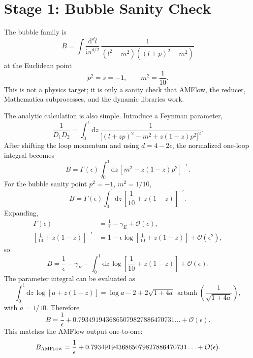 \documentclass[11pt]{article}
\newcommand{\dd}{\mathrm{d}}
\newcommand{\ii}{\mathrm{i}}
\newcommand{\eps}{\epsilon}
\newcommand{\AMFlow}{\textsc{AMFlow}}
\begin{document}
\section{Stage 1: Bubble Sanity Check}

The bubble family is
\begin{equation}
  B =
  \int \frac{\dd^d l}{\ii\pi^{d/2}}\,
  \frac{1}{(l^2-m^2)((l+p)^2-m^2)}
\end{equation}
at the Euclidean point
\begin{equation}
  p^2=s=-1,\qquad m^2=\frac{1}{10}.
\end{equation}
This is not a physics target; it is only a sanity check that AMFlow, the
reducer, Mathematica subprocesses, and the dynamic libraries work.

The analytic calculation is also simple. Introduce a Feynman parameter,
\begin{equation}
  \frac{1}{D_1D_2}
  =
  \int_0^1 \dd z\,
  \frac{1}{\bigl[(l+zp)^2-m^2+z(1-z)p^2\bigr]^2}.
\end{equation}
After shifting the loop momentum and using \(d=4-2\eps\), the normalized
one-loop integral becomes
\begin{equation}
  B
  =
  \Gamma(\eps)
  \int_0^1\dd z\,
  \left[m^2-z(1-z)p^2\right]^{-\eps}.
\end{equation}
For the bubble sanity point \(p^2=-1\), \(m^2=1/10\),
\begin{equation}
  B
  =
  \Gamma(\eps)
  \int_0^1\dd z\,
  \left[\frac{1}{10}+z(1-z)\right]^{-\eps}.
\end{equation}
Expanding,
\begin{align}
  \Gamma(\eps)
  &=
  \frac{1}{\eps}-\gamma_E+\mathcal{O}(\eps),
  \\
  \left[\frac{1}{10}+z(1-z)\right]^{-\eps}
  &=
  1-\eps\log\!\left[\frac{1}{10}+z(1-z)\right]
  +\mathcal{O}(\eps^2),
\end{align}
so
\begin{equation}
  B
  =
  \frac{1}{\eps}
  -
  \gamma_E
  -
  \int_0^1\dd z\,
  \log\!\left[\frac{1}{10}+z(1-z)\right]
  +\mathcal{O}(\eps).
\end{equation}
The parameter integral can be evaluated as
\begin{equation}
  \int_0^1\dd z\,
  \log\!\left[a+z(1-z)\right]
  =
  \log a - 2
  +2\sqrt{1+4a}\,
  \operatorname{artanh}\!\left(\frac{1}{\sqrt{1+4a}}\right),
\end{equation}
with \(a=1/10\). Therefore
\begin{equation}
  B
  =
  \frac{1}{\eps}
  +0.7934919436865079827886470731\ldots
  +\mathcal{O}(\eps).
\end{equation}
This matches the AMFlow output one-to-one:
\begin{equation}
  B_{\AMFlow}
  =
  \frac{1}{\eps}
  +0.7934919436865079827886470731\ldots
  +\mathcal{O}(\eps).
\end{equation}
\end{document}
